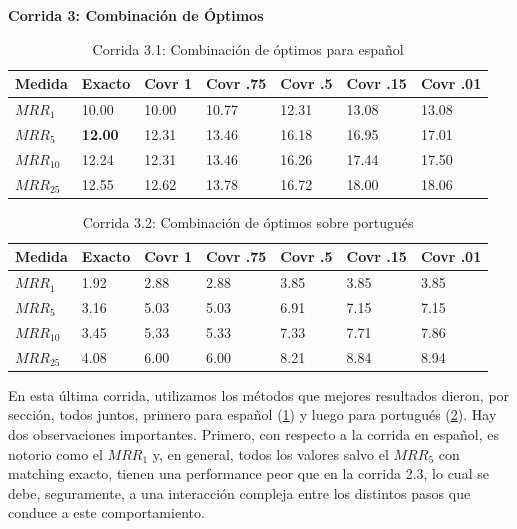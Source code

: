 \medskip
\textbf{Corrida 3: Combinación de Óptimos}\newline




\begin{table}
\centering
\begin{center}
\begin{tabular}{|l | l | l | l | l | l | l |}
\hline
Medida & Exacto & Covr 1 & Covr .75 & Covr .5 & Covr .15 & Covr .01 \\ \hline
$MRR_{1}$ & 10.00 & 10.00 & 10.77 & 12.31 & 13.08 & 13.08  \\ \hline
$MRR_{5}$ & \textbf{12.00} & 12.31 & 13.46 & 16.18 & 16.95 & 17.01  \\ \hline
$MRR_{10}$ & 12.24 & 12.31 & 13.46 & 16.26 & 17.44 & 17.50  \\ \hline
$MRR_{25}$ & 12.55 & 12.62 & 13.78 & 16.72 & 18.00 & 18.06  \\ \hline
\end{tabular}
\medskip
\caption{Corrida 3.1: Combinación de óptimos para español}
\label{table:optimos}
\end{center}
\end{table}

\begin{table}
\centering
\begin{center}
\begin{tabular}{|l | l | l | l | l | l | l |}
\hline
Medida & Exacto & Covr 1 & Covr .75 & Covr .5 & Covr .15 & Covr .01 \\ \hline
$MRR_{1}$ & 1.92 & 2.88 & 2.88 & 3.85 & 3.85 & 3.85  \\ \hline
$MRR_{5}$ & 3.16 & 5.03 & 5.03 & 6.91 & 7.15 & 7.15  \\ \hline
$MRR_{10}$ & 3.45 & 5.33 & 5.33 & 7.33 & 7.71 & 7.86  \\ \hline
$MRR_{25}$ & 4.08 & 6.00 & 6.00 & 8.21 & 8.84 & 8.94  \\ \hline
\end{tabular}
\caption{Corrida 3.2: Combinación de óptimos sobre portugués}
\label{table:2_3_2_40_getExactMRRWikiFactoid_getCovrMRRWikiFactoid}
\end{center}
\end{table}


En esta última corrida, utilizamos los métodos que mejores resultados dieron, por sección, todos juntos, primero para español (\ref{table:optimos}) y luego para portugués (\ref{table:2_3_2_40_getExactMRRWikiFactoid_getCovrMRRWikiFactoid}).
Hay dos observaciones importantes. Primero, con respecto a la corrida en español, es notorio como el $MRR_1$ y, en general, todos los valores salvo el $MRR_5$ con matching exacto, tienen una performance peor que en la corrida 2.3, lo cual se debe, seguramente, a una interacción compleja entre los distintos pasos que conduce a este comportamiento.


